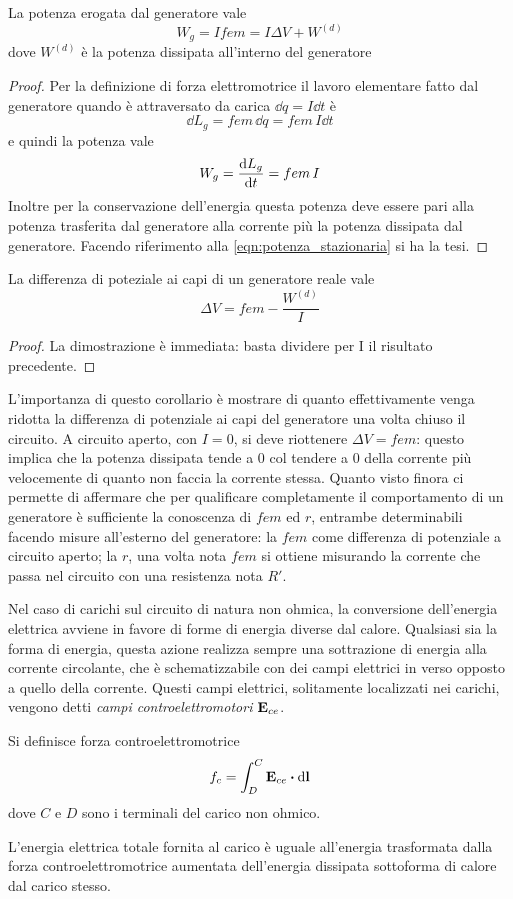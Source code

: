 \begin{thm}
    La potenza erogata dal generatore vale
    \begin{equation}
        W_g=Ifem= I\Delta V+W^{(d)}
    \end{equation}
    dove $W^{(d)}$ è la potenza dissipata all'interno del generatore
\end{thm}
\begin{proof}
    Per la definizione di forza elettromotrice il lavoro elementare fatto dal generatore quando è attraversato da carica $\dd{q}=I\dd{t}$ è
    \[
        \dd{L_g}=fem\,\dd{q}=fem\,I\dd{t}
    \]
    e quindi la potenza vale
    \[
        W_g=\dv{L_g}{t}=fem\,I
    \]
    Inoltre per la conservazione dell'energia questa potenza deve essere pari alla potenza trasferita dal generatore
    alla corrente più la potenza dissipata dal generatore. Facendo riferimento alla \eqref{eqn:potenza_stazionaria} si ha la tesi.
\end{proof}
\begin{cor}
    La differenza di poteziale ai capi di un generatore reale vale
    \begin{equation}
        \Delta V=fem-\frac{W^{(d)}}{I}
    \end{equation}
\end{cor}
\begin{proof}
    La dimostrazione è immediata: basta dividere per I il risultato precedente.
\end{proof}
L'importanza di questo corollario è mostrare di quanto effettivamente venga ridotta la differenza
di potenziale ai capi del generatore una volta chiuso il circuito. A circuito aperto, con $I=0$,
si deve riottenere $\Delta V=fem$: questo implica che la potenza dissipata tende a 0 col tendere a 0
della corrente più velocemente di quanto non faccia la corrente stessa.
Quanto visto finora ci permette di affermare che per qualificare completamente il comportamento di un generatore
è sufficiente la conoscenza di $fem$ ed $r$, entrambe determinabili facendo misure all'esterno del generatore:
la $fem$ come differenza di potenziale a circuito aperto; la $r$,
una volta nota $fem$ si ottiene misurando la corrente che passa nel circuito con una resistenza nota $R'$.


Nel caso di carichi sul circuito di natura non ohmica, la conversione dell'energia elettrica
avviene in favore di forme di energia diverse dal calore. Qualsiasi sia la forma di energia,
questa azione realizza sempre una sottrazione di energia alla corrente circolante, che è schematizzabile con dei campi elettrici
in verso opposto a quello della corrente. Questi campi elettrici, solitamente localizzati nei carichi,
vengono detti \textit{campi controelettromotori} $\vb{E}_{ce}$.
\begin{defn}
    Si definisce forza controelettromotrice
    \[
        f_c=\int_D^C \vb{E}_{ce}\vdot\dd{\vb{l}}
    \]
    dove $C$ e $D$ sono i terminali del carico non ohmico.
\end{defn}
\begin{obs}
    L'energia elettrica totale fornita al carico è uguale all'energia trasformata dalla forza controelettromotrice
    aumentata dell'energia dissipata sottoforma di calore dal carico stesso.
\end{obs}
